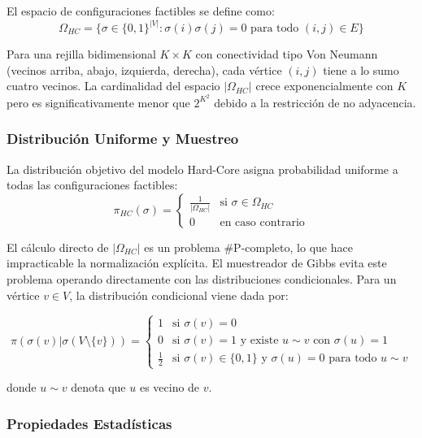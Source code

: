 El espacio de configuraciones factibles se define como:
\begin{equation}
\Omega_{HC} = \{\sigma \in \{0,1\}^{|V|} : \sigma(i)\sigma(j) = 0 \text{ para todo } (i,j) \in E\}
\end{equation}

Para una rejilla bidimensional $K \times K$ con conectividad tipo Von Neumann (vecinos arriba, abajo, izquierda, derecha), cada vértice $(i,j)$ tiene a lo sumo cuatro vecinos. La cardinalidad del espacio $|\Omega_{HC}|$ crece exponencialmente con $K$ pero es significativamente menor que $2^{K^2}$ debido a la restricción de no adyacencia.

\subsubsection{Distribución Uniforme y Muestreo}

La distribución objetivo del modelo Hard-Core asigna probabilidad uniforme a todas las configuraciones factibles:
\begin{equation}
\pi_{HC}(\sigma) = \begin{cases}
\frac{1}{|\Omega_{HC}|} & \text{si } \sigma \in \Omega_{HC} \\
0 & \text{en caso contrario}
\end{cases}
\end{equation}

El cálculo directo de $|\Omega_{HC}|$ es un problema \#P-completo, lo que hace impracticable la normalización explícita. El muestreador de Gibbs evita este problema operando directamente con las distribuciones condicionales. Para un vértice $v \in V$, la distribución condicional viene dada por:

\begin{equation}
\pi(\sigma(v) | \sigma(V \setminus \{v\})) = \begin{cases}
1 & \text{si } \sigma(v) = 0 \\
0 & \text{si } \sigma(v) = 1 \text{ y existe } u \sim v \text{ con } \sigma(u) = 1 \\
\frac{1}{2} & \text{si } \sigma(v) \in \{0,1\} \text{ y } \sigma(u) = 0 \text{ para todo } u \sim v
\end{cases}
\end{equation}

donde $u \sim v$ denota que $u$ es vecino de $v$.

\subsubsection{Propiedades Estadísticas}


